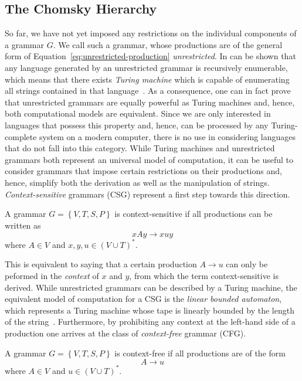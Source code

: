 \subsection{The Chomsky Hierarchy}
\label{sec:chomsky-hierarchy}
So far, we have not yet imposed any restrictions on the individual components of a grammar $G$.
We call such a grammar, whose productions are of the general form of Equation~\eqref{eq:unrestricted-production} \emph{unrestricted}.
In can be shown that any language generated by an unrestricted grammar is recursively enumerable, which means that there exists \emph{Turing machine} which is capable of enumerating all strings contained in that language~\cite{linz2006introduction}.
As a consequence, one can in fact prove that unrestricted grammars are equally powerful as Turing machines and, hence, both computational models are equivalent.
Since we are only interested in languages that possess this property and, hence, can be processed by any Turing-complete system on a modern computer, there is no use in considering languages that do not fall into this category.
While Turing machines and unrestricted grammars both represent an universal model of computation, it can be useful to consider grammars that impose certain restrictions on their productions and, hence, simplify both the derivation as well as the manipulation of strings.
\emph{Context-sensitive} grammars (CSG) represent a first step towards this direction.
\begin{definition}
A grammar $G = \left\{V, T, S, P\right\}$ is context-sensitive if all productions can be written as
\begin{equation*}
	xAy \to xuy
\end{equation*}
where $A \in V$ and $x, y, u \in \left(V \cup T\right)^*$.
\label{def:context-sensitive-grammar}
\end{definition}
This is equivalent to saying that a certain production $A \to u$ can only be peformed in the \emph{context} of $x$ and $y$, from which the term context-sensitive is derived.
While unrestricted grammars can be described by a Turing machine, the equivalent model of computation for a CSG is the \emph{linear bounded automaton}, which represents a Turing machine whose tape is linearly bounded by the length of the string~\cite{linz2006introduction}.
Furthermore, by prohibiting any context at the left-hand side of a production one arrives at the class of \emph{context-free} grammar (CFG).
\begin{definition}
	A grammar $G = \left\{V, T, S, P\right\}$ is context-free if all productions are of the form
	\begin{equation*}
		A \to u 
	\end{equation*}
	where $A \in V$ and $u \in \left(V \cup T\right)^*$.
\end{definition}
